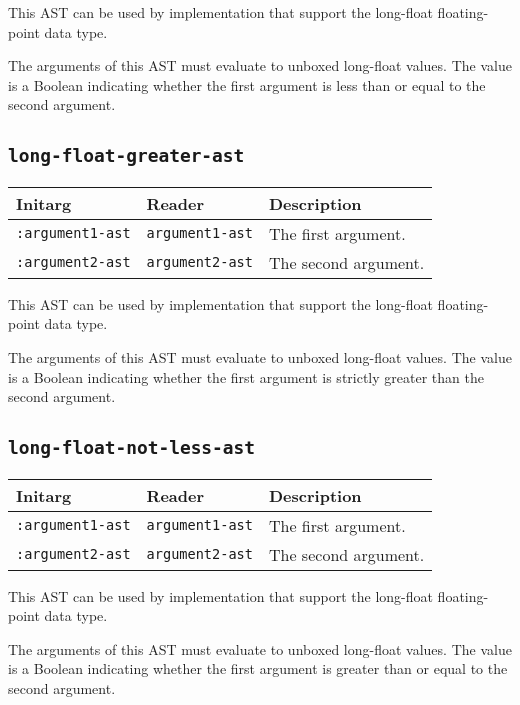 This AST can be used by implementation that support the long-float
floating-point data type.  

The arguments of this AST must evaluate to unboxed long-float
values.  The value is a Boolean indicating whether the first argument
is less than or equal to the second argument.

\subsection{\texttt{long-float-greater-ast}}
\label{sec-ast-long-float-greater}

\begin{tabular}{|l|l|l|}
\hline
Initarg & Reader & Description\\
\hline\hline
\texttt{:argument1-ast} & \texttt{argument1-ast} & The first argument.\\
\hline
\texttt{:argument2-ast} & \texttt{argument2-ast} & The second argument.\\
\hline
\end{tabular}

This AST can be used by implementation that support the long-float
floating-point data type.  

The arguments of this AST must evaluate to unboxed long-float
values.  The value is a Boolean indicating whether the first argument
is strictly greater than the second argument.

\subsection{\texttt{long-float-not-less-ast}}
\label{sec-ast-long-float-not-less}

\begin{tabular}{|l|l|l|}
\hline
Initarg & Reader & Description\\
\hline\hline
\texttt{:argument1-ast} & \texttt{argument1-ast} & The first argument.\\
\hline
\texttt{:argument2-ast} & \texttt{argument2-ast} & The second argument.\\
\hline
\end{tabular}

This AST can be used by implementation that support the long-float
floating-point data type.  

The arguments of this AST must evaluate to unboxed long-float
values.  The value is a Boolean indicating whether the first argument
is greater than or equal to the second argument.

